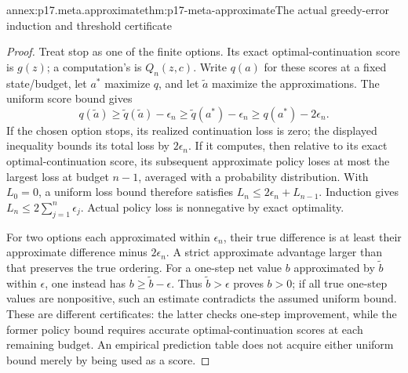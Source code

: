 \begin{annexitem}{annex:p17.meta.approximate}{thm:p17-meta-approximate}{The actual greedy-error induction and threshold certificate}
\begin{proof}
Treat stop as one of the finite options. Its exact
optimal-continuation score is \(g(z)\); a computation's is
\(Q_n(z,c)\). Write \(q(a)\) for these scores at a fixed
state/budget, let \(a^*\) maximize \(q\), and let \(\tilde a\)
maximize the approximations. The uniform score bound gives
\[
 q(\tilde a)\geq\widetilde q(\tilde a)-\epsilon_n
 \geq\widetilde q(a^*)-\epsilon_n
 \geq q(a^*)-2\epsilon_n.
\]
If the chosen option stops, its realized continuation loss is zero;
the displayed inequality bounds its total loss by \(2\epsilon_n\).
If it computes, then relative to its exact optimal-continuation
score, its subsequent approximate policy loses at most the
largest loss at budget \(n-1\), averaged with a probability
distribution. With \(L_0=0\), a uniform loss bound therefore
satisfies \(L_n\leq2\epsilon_n+L_{n-1}\).
Induction gives \(L_n\leq2\sum_{j=1}^n\epsilon_j\).
Actual policy loss is nonnegative by exact optimality.

For two options each approximated within \(\epsilon_n\),
their true difference is at least their approximate difference
minus \(2\epsilon_n\). A strict approximate advantage larger
than that preserves the true ordering. For a one-step net value
\(b\) approximated by \(\tilde b\) within \(\epsilon\),
one instead has \(b\geq\tilde b-\epsilon\).
Thus \(\tilde b>\epsilon\) proves \(b>0\); if all true
one-step values are nonpositive, such an estimate contradicts
the assumed uniform bound. These are different certificates:
the latter checks one-step improvement, while the former policy
bound requires accurate optimal-continuation scores at each
remaining budget. An empirical prediction table does not acquire
either uniform bound merely by being used as a score.
\end{proof}
\end{annexitem}

